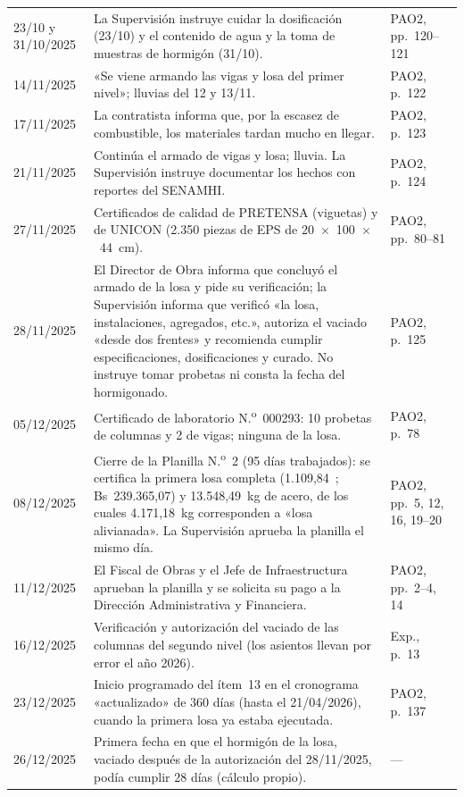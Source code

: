 \begin{longtable}{@{}P{2.3cm}P{10.4cm}P{2.8cm}@{}}
23/10 y 31/10/2025 & La Supervisión instruye cuidar la dosificación (23/10) y el contenido de agua y la toma de muestras de hormigón (31/10). & PAO2, pp.~120--121 \\
14/11/2025 & «Se viene armando las vigas y losa del primer nivel»; lluvias del 12 y 13/11. & PAO2, p.~122 \\
17/11/2025 & La contratista informa que, por la escasez de combustible, los materiales tardan mucho en llegar. & PAO2, p.~123 \\
21/11/2025 & Continúa el armado de vigas y losa; lluvia. La Supervisión instruye documentar los hechos con reportes del SENAMHI. & PAO2, p.~124 \\
27/11/2025 & Certificados de calidad de PRETENSA (viguetas) y de UNICON (2.350 piezas de EPS de 20~$\times$~100~$\times$~44~cm). & PAO2, pp.~80--81 \\
28/11/2025 & El Director de Obra informa que concluyó el armado de la losa y pide su verificación; la Supervisión informa que verificó «la losa, instalaciones, agregados, etc.», autoriza el vaciado «desde dos frentes» y recomienda cumplir especificaciones, dosificaciones y curado. No instruye tomar probetas ni consta la fecha del hormigonado. & PAO2, p.~125 \\
05/12/2025 & Certificado de laboratorio N.\textsuperscript{o}~000293: 10 probetas de columnas y 2 de vigas; ninguna de la losa. & PAO2, p.~78 \\
08/12/2025 & Cierre de la Planilla N.\textsuperscript{o}~2 (95 días trabajados): se certifica la primera losa completa (1.109,84~\mdos{}; Bs~239.365,07) y 13.548,49~kg de acero, de los cuales 4.171,18~kg corresponden a «losa alivianada». La Supervisión aprueba la planilla el mismo día. & PAO2, pp.~5, 12, 16, 19--20 \\
11/12/2025 & El Fiscal de Obras y el Jefe de Infraestructura aprueban la planilla y se solicita su pago a la Dirección Administrativa y Financiera. & PAO2, pp.~2--4, 14 \\
16/12/2025 & Verificación y autorización del vaciado de las columnas del segundo nivel (los asientos llevan por error el año 2026). & Exp., p.~13 \\
23/12/2025 & Inicio programado del ítem~13 en el cronograma «actualizado» de 360 días (hasta el 21/04/2026), cuando la primera losa ya estaba ejecutada. & PAO2, p.~137 \\
26/12/2025 & Primera fecha en que el hormigón de la losa, vaciado después de la autorización del 28/11/2025, podía cumplir 28 días (cálculo propio). & --- \\

\end{longtable}
